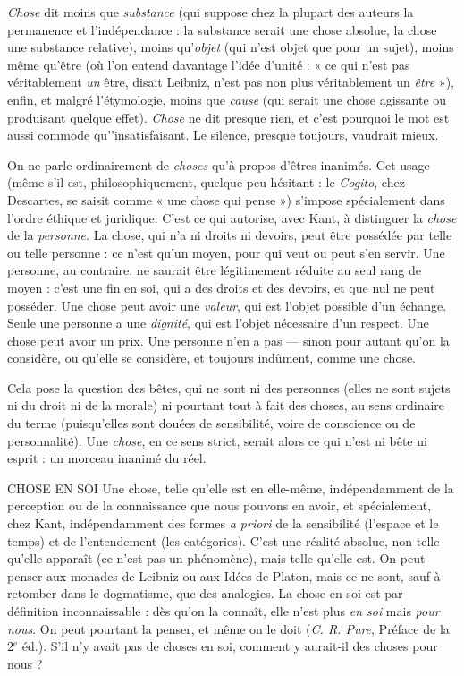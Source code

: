 {\it Chose} dit moins que {\it substance} (qui suppose chez la plupart des auteurs la
permanence et l'indépendance : la substance serait une chose absolue, la chose
une substance relative), moins qu’{\it objet} (qui n’est objet que pour un sujet),
moins même qu'être (où l’on entend davantage l’idée d’unité : « ce qui n'est
pas véritablement {\it un} être, disait Leibniz, n’est pas non plus véritablement un
{\it être} »), enfin, et malgré l’étymologie, moins que {\it cause} (qui serait une chose agissante
ou produisant quelque effet). {\it Chose} ne dit presque rien, et c’est pourquoi
le mot est aussi commode qu'’insatisfaisant. Le silence, presque toujours, vaudrait
mieux.

On ne parle ordinairement de {\it choses} qu’à propos d’êtres inanimés. Cet
usage (même s’il est, philosophiquement, quelque peu hésitant : le {\it Cogito}, chez
Descartes, se saisit comme « une chose qui pense ») s'impose spécialement dans
l’ordre éthique et juridique. C’est ce qui autorise, avec Kant, à distinguer la
{\it chose} de la {\it personne}. La chose, qui n’a ni droits ni devoirs, peut être possédée
par telle ou telle personne : ce n’est qu’un moyen, pour qui veut ou peut s’en
servir. Une personne, au contraire, ne saurait être légitimement réduite au seul
rang de moyen : c’est une fin en soi, qui a des droits et des devoirs, et que nul
ne peut posséder. Une chose peut avoir une {\it valeur}, qui est l’objet possible d’un
échange. Seule une personne a une {\it dignité}, qui est l’objet nécessaire d’un respect.
Une chose peut avoir un prix. Une personne n’en a pas — sinon pour
autant qu'on la considère, ou qu’elle se considère, et toujours indûment,
comme une chose.

Cela pose la question des bêtes, qui ne sont ni des personnes (elles ne sont
sujets ni du droit ni de la morale) ni pourtant tout à fait des choses, au sens
ordinaire du terme (puisqu'elles sont douées de sensibilité, voire de conscience
ou de personnalité). Une {\it chose}, en ce sens strict, serait alors ce qui n’est ni bête
ni esprit : un morceau inanimé du réel.

CHOSE EN SOI Une chose, telle qu’elle est en elle-même, indépendamment
de la perception ou de la connaissance que nous
pouvons en avoir, et spécialement, chez Kant, indépendamment des formes
{\it a priori} de la sensibilité (l’espace et le temps) et de l’entendement (les catégories).
C’est une réalité absolue, non telle qu’elle apparaît (ce n’est pas un phénomène),
mais telle qu’elle est. On peut penser aux monades de Leibniz ou aux
Idées de Platon, mais ce ne sont, sauf à retomber dans le dogmatisme, que des
analogies. La chose en soi est par définition inconnaissable : dès qu’on la
connaît, elle n’est plus {\it en soi} mais {\it pour nous}. On peut pourtant la penser, et
même on le doit ({\it C. R. Pure}, Préface de la 2$^\text{e}$ éd.). S’il n’y avait pas de choses
en soi, comment y aurait-il des choses pour nous ?

